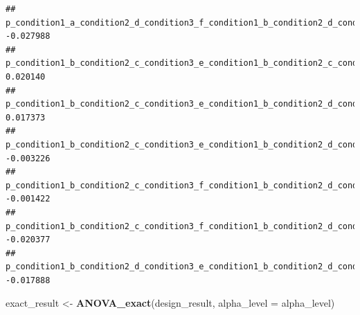 \documentclass[]{book}
\newenvironment{Shaded}{\begin{snugshade}}{\end{snugshade}}
\newcommand{\DataTypeTok}[1]{\textcolor[rgb]{0.13,0.29,0.53}{#1}}
\newcommand{\KeywordTok}[1]{\textcolor[rgb]{0.13,0.29,0.53}{\textbf{#1}}}
\newcommand{\NormalTok}[1]{#1}
\newcommand{\StringTok}[1]{\textcolor[rgb]{0.31,0.60,0.02}{#1}}
\begin{document}
\begin{verbatim}
## p_condition1_a_condition2_d_condition3_f_condition1_b_condition2_d_condition3_f   -0.027988
## p_condition1_b_condition2_c_condition3_e_condition1_b_condition2_c_condition3_f    0.020140
## p_condition1_b_condition2_c_condition3_e_condition1_b_condition2_d_condition3_e    0.017373
## p_condition1_b_condition2_c_condition3_e_condition1_b_condition2_d_condition3_f   -0.003226
## p_condition1_b_condition2_c_condition3_f_condition1_b_condition2_d_condition3_e   -0.001422
## p_condition1_b_condition2_c_condition3_f_condition1_b_condition2_d_condition3_f   -0.020377
## p_condition1_b_condition2_d_condition3_e_condition1_b_condition2_d_condition3_f   -0.017888
\end{verbatim}

\begin{Shaded}
\begin{Highlighting}[]
\NormalTok{exact_result <-}\StringTok{ }\KeywordTok{ANOVA_exact}\NormalTok{(design_result, }\DataTypeTok{alpha_level =}\NormalTok{ alpha_level)}
\end{Highlighting}
\end{Shaded}
\end{document}
